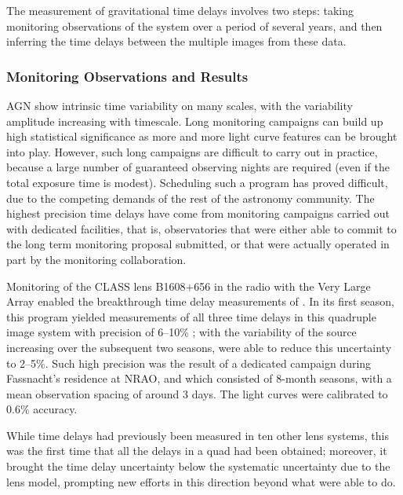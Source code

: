 The measurement of gravitational time delays involves two steps:  taking
monitoring observations of the system over a period of several years,
and then inferring the time delays between the multiple images from
these data.


\subsubsection{Monitoring Observations and Results}

AGN show intrinsic time variability on many scales, with the variability
amplitude increasing  with timescale. Long monitoring campaigns can
build up high statistical  significance as more and more light curve
features can be brought into play.  However, such long campaigns are
difficult to carry out in practice,  because a large number of
guaranteed observing nights are required (even if the total exposure
time is modest). Scheduling such a program has proved difficult, due to
the  competing demands of the rest of the astronomy community. The
highest precision  time delays have come from monitoring campaigns
carried out with dedicated facilities, that is, observatories that were
either able to commit to the long term monitoring proposal submitted, or
that were actually operated in part by the monitoring collaboration.



Monitoring of the CLASS lens B1608$+$656 in the radio with the Very
Large Array enabled the breakthrough  time delay measurements of
\citep{Fas++02}. In its first season, this program  yielded measurements
of all three time delays in this quadruple image system with  precision
of 6--10\% \citep{Fas++99}; with the variability of the source
increasing over the subsequent two seasons, \citep{Fas++02} were able to
reduce this uncertainty to 2--5\%. Such high precision was the result of
a dedicated campaign during Fassnacht's residence at NRAO, and which
consisted of 8-month seasons, with a mean observation spacing of around
3 days. The light curves were calibrated to 0.6\% accuracy.

While time delays had previously been measured in ten other lens
systems, this was the first time that all  the delays in a quad had been
obtained; moreover, it brought the time  delay uncertainty below the
systematic uncertainty due to the lens model,  prompting new efforts in
this direction beyond what \citep{K+F99} were able to do.

